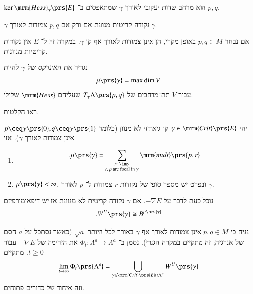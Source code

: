 \documentclass[a4paper,10pt,twoside,openany]{book}
\begin{document}
\begin{theorem}
$\ker \mrm{Hess}_\gamma\prs{E}$
הוא מרחב שדות יעקובי לאורך
$\gamma$
שמתאפסים ב־%
$p,q$.
\end{theorem}

\begin{corollary}
$\gamma$
נקודה קריטית מנוונת אם ורק אם
$p,q$
צמודות לאורך
$\gamma$.
\end{corollary}

\begin{remark}
אם נבחר
$p,q \in M$
באופן מקרי, הן אינן צמודות לאורך אף קו
$\gamma$.
במקרה זה ל־%
$E$
אין נקודות קריטיות מנוונות.
\end{remark}

\begin{definition}[אינדקס]
נגדיר את
\emph{האינדקס של
$\gamma$}
להיות
\[\mu\prs{\gamma} = \max \dim V\]
עבור
$V$
תת־מרחבים של
$T_\gamma \Lambda\prs{p,q}$
שעליהם
$\mrm{Hess}$
שלילי.
\end{definition}

\begin{example}
ראו הקלטות.
\end{example}

\begin{theorem}[מורס]
יהי
$\gamma \in \mrm{Crit}\prs{E}$
קו גיאודזי לא מנוון (כלומר $p \ceq \gamma\prs{0}, q \ceq \gamma\prs{1}$ אינן צמודות לאורך
$\gamma$).
אזי
\begin{enumerate}
\item 
\begin{align*}
\text{.} \mu\prs{\gamma} = \sum_{\substack{r \in \im \gamma \\ \text{$r,p$ are focal in $\gamma$}}} \mrm{mult}\prs{p,r}
\end{align*}

\item $\mu\prs{\gamma} < \infty$,
ובפרט יש מספר סופי של נקודות
$r$
צמודות ל־%
$p$
לאורך
$\gamma$.
\end{enumerate}
\end{theorem}

נוכל כעת לדבר על
$-\nabla E$.
אם
$\gamma$
נקודה קריטית לא מנוונת אז יש דיפאומורפיזם
\[\text{.} W^U\prs{\gamma} \cong B^{\mu\prs{\gamma}}\]

\begin{corollary}
נניח כי
$p,q \in M$
אינן צמודות לאורך אף
$\gamma$
באורך לכל היותר
$\sqrt{a}$
(כאשר נסתכל על
$a$
חסם של אנרגיה; זה מתקיים במקרה הגנרי).
נסמן ב־%
$\Phi_t \colon \Lambda^a \to \Lambda^a$
את הזרימה של
$-\nabla E$
עבור
$t \geq 0$.
מתקיים
\begin{align*}
\lim_{t \to \infty} \Phi_t \prs{\Lambda^a} = \bigcup_{\gamma \in \mrm{Crit}\prs{E} \cap \Lambda^a} W^U\prs{\gamma}
\end{align*}
וזה איחוד של כדורים פתוחים.
\end{corollary}
\end{document}

